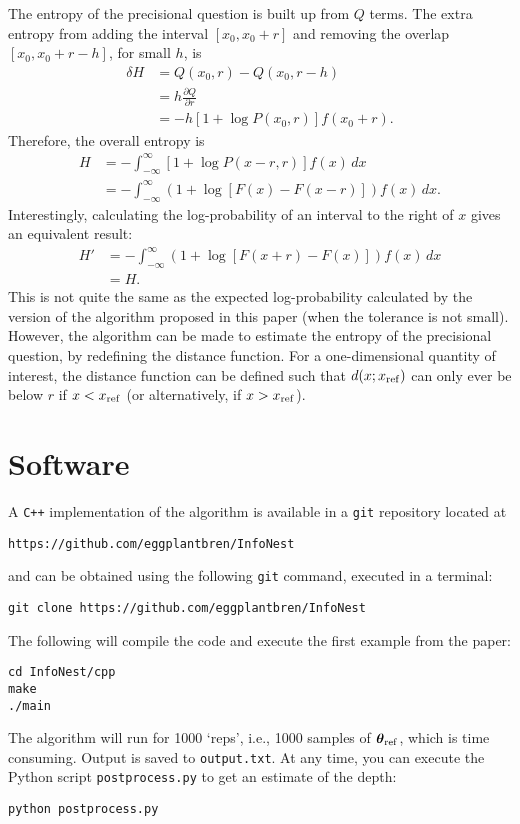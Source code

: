 \documentclass[entropy,article,accept,oneauthor,pdftex,10pt,a4paper]{mdpi}
\newcommand{\revision}{\color{darkblue}}
\newcommand{\x}{\boldsymbol{\theta}}
\newcommand{\xref}{\x_{\rm ref}}
\begin{document}
The entropy of the precisional question is built up from
$Q$ terms. The extra entropy from adding the interval
$[x_0, x_0 + r]$ and removing the overlap $[x_0, x_0 + r - h]$, for small $h$, is
\begin{align}
\delta H &= Q(x_0, r) - Q(x_0, r - h)\\
         &= h\frac{\partial Q}{\partial r} \\
         &= -h\left[1 + \log P(x_0, r)\right]f(x_0 + r).
\end{align}
Therefore, the overall entropy is
\begin{align}
H &= -\int_{-\infty}^\infty
        \left[1 + \log P(x-r, r)\right]f(x)
      \, dx \\
  &= -\int_{-\infty}^\infty
        \left(1 + \log\left[F(x) - F(x-r)\right]\right)f(x)
      \, dx.
\end{align}
Interestingly, calculating the log-probability of an interval
to the right of $x$ gives an equivalent result:
\begin{align}
H' &=  -\int_{-\infty}^\infty
        \left(1 + \log\left[F(x+r) - F(x)\right]\right)f(x)
      \, dx \\
   &= H.
\end{align}
This is not quite the same as the expected log-probability calculated by
the version of the algorithm proposed in this paper (when the tolerance is not
small). However, the algorithm can be made to estimate the entropy of the
precisional question, by redefining the distance function. {\revision For a one-dimensional
quantity of interest, the distance function can be defined such that
$d(x; x_{\rm ref})$ can only ever be below $r$ if $x < x_{\rm ref}$ (or alternatively,
if $x > x_{\rm ref}$).}

\appendix
\section{Software}
\label{sec:software}

A {\tt C++} implementation of the algorithm is available in a {\tt git}
repository located at
\begin{verbatim}
https://github.com/eggplantbren/InfoNest
\end{verbatim}
and can be obtained using the following {\tt git} command, executed in a
terminal:
\begin{verbatim}
git clone https://github.com/eggplantbren/InfoNest
\end{verbatim}
The following will compile the code and execute the first example from the
paper:
\begin{verbatim}
cd InfoNest/cpp
make
./main
\end{verbatim}
The algorithm will run for 1000 `reps', i.e., 1000 samples of $\xref$, which is
time consuming. Output is saved to {\tt output.txt}. At any time,
you can execute the Python script {\tt postprocess.py} to get an estimate of
the depth:
\begin{verbatim}
python postprocess.py
\end{verbatim}
\end{document}
